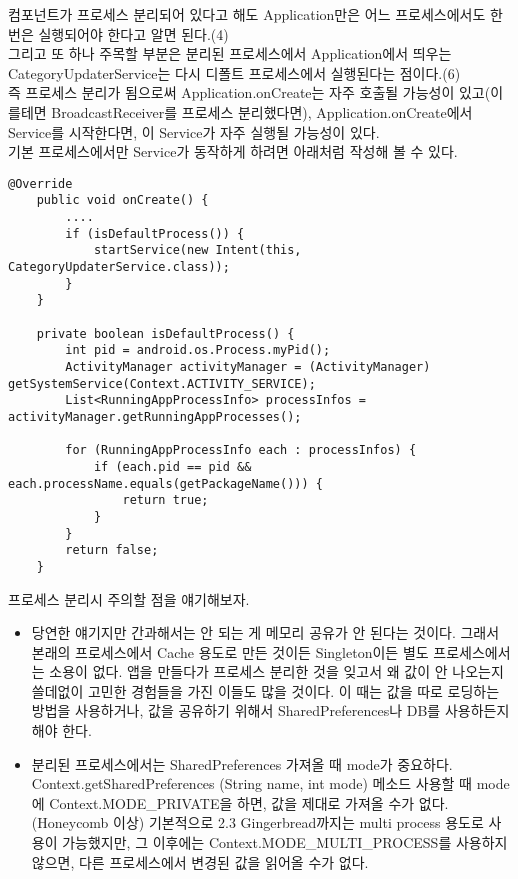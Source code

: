 컴포넌트가 프로세스 분리되어 있다고 해도 Application만은 어느 프로세스에서도 한번은 실행되어야 한다고 알면 된다.(4)\\
그리고 또 하나 주목할 부분은 분리된 프로세스에서 Application에서 띄우는 CategoryUpdaterService는 다시 디폴트 프로세스에서 실행된다는 점이다.(6)\\
즉 프로세스 분리가 됨으로써 Application.onCreate는 자주 호출될 가능성이 있고(이를테면 BroadcastReceiver를 프로세스 분리했다면), Application.onCreate에서 Service를 시작한다면, 이 Service가 자주 실행될 가능성이 있다.\\
기본 프로세스에서만 Service가 동작하게 하려면 아래처럼 작성해 볼 수 있다.

\begin{lstlisting}[frame=single] 
	@Override
	public void onCreate() {
		....
		if (isDefaultProcess()) {
			startService(new Intent(this, CategoryUpdaterService.class));
		}
	}
	
	private boolean isDefaultProcess() {
		int pid = android.os.Process.myPid();
        ActivityManager activityManager = (ActivityManager) getSystemService(Context.ACTIVITY_SERVICE);                      
        List<RunningAppProcessInfo> processInfos = activityManager.getRunningAppProcesses();     

        for (RunningAppProcessInfo each : processInfos) {                          
            if (each.pid == pid && each.processName.equals(getPackageName())) {                              
                return true;
            }                         
        }
        return false;
    }
\end{lstlisting}

프로세스 분리시 주의할 점을 얘기해보자.
\begin{itemize}
\item 당연한 얘기지만 간과해서는 안 되는 게 메모리 공유가 안 된다는 것이다. 그래서 본래의 프로세스에서 Cache 용도로 만든 것이든 Singleton이든 별도 프로세스에서는 소용이 없다. 앱을 만들다가 프로세스 분리한 것을 잊고서 왜 값이 안 나오는지 쓸데없이 고민한 경험들을 가진 이들도 많을 것이다.
이 때는 값을 따로 로딩하는 방법을 사용하거나, 값을 공유하기 위해서 SharedPreferences나 DB를 사용하든지 해야 한다.
\item 분리된 프로세스에서는 SharedPreferences 가져올 때  mode가 중요하다.\\
Context.getSharedPreferences (String name, int mode) 메소드 사용할 때  mode에 Context.MODE\_PRIVATE을 하면, 값을 제대로 가져올 수가 없다.(Honeycomb 이상)
기본적으로 2.3 Gingerbread까지는 multi process 용도로 사용이 가능했지만, 그 이후에는 Context.MODE\_MULTI\_PROCESS를 사용하지 않으면, 다른 프로세스에서 변경된 값을 읽어올 수가 없다.
\end{itemize}

\begin{comment}
android:multiprocess 옵션은 Activity와 ContentProvider만 있음.
\end{comment}
